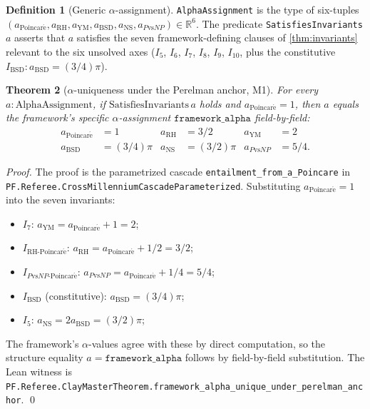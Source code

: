 \documentclass[11pt,a4paper]{article}
\theoremstyle{plain}
\newtheorem{theorem}{Theorem}[section]
\theoremstyle{definition}
\newtheorem{definition}[theorem]{Definition}
\begin{document}
\begin{definition}[Generic $\alpha$-assignment]
\label{def:alpha_assignment}
\texttt{AlphaAssignment} is the type of six-tuples
$(a_{\mathrm{Poincar\acute e}}, a_{\mathrm{RH}}, a_{\mathrm{YM}},
a_{\mathrm{BSD}}, a_{\mathrm{NS}}, a_{P \mathrm{vs} NP}) \in \mathbb{R}^{6}$.
The predicate \texttt{SatisfiesInvariants $a$} asserts that $a$
satisfies the seven framework-defining clauses of
\cref{thm:invariants} relevant to the six unsolved axes ($I_{5}$,
$I_{6}$, $I_{7}$, $I_{8}$, $I_{9}$, $I_{10}$, plus the constitutive
$I_{\mathrm{BSD}}: a_{\mathrm{BSD}} = (3/4)\pi$).
\end{definition}

\begin{theorem}[$\alpha$-uniqueness under the Perelman anchor, M1]
\label{thm:uniqueness}
For every $a : \mathrm{AlphaAssignment}$, if
$\mathrm{SatisfiesInvariants}\,a$ holds and
$a_{\mathrm{Poincar\acute e}} = 1$, then $a$ equals the framework's
specific $\alpha$-assignment $\mathtt{framework\_alpha}$
field-by-field:
\begin{align*}
a_{\mathrm{Poincar\acute e}} &= 1 &
a_{\mathrm{RH}} &= 3/2 &
a_{\mathrm{YM}} &= 2 \\
a_{\mathrm{BSD}} &= (3/4)\pi &
a_{\mathrm{NS}} &= (3/2)\pi &
a_{P\mathrm{vs}NP} &= 5/4.
\end{align*}
\end{theorem}

\begin{proof}
The proof is the parametrized cascade
\texttt{entailment\_from\_a\_Poincare} in
\texttt{PF.Referee.CrossMillenniumCascadeParameterized}. Substituting
$a_{\mathrm{Poincar\acute e}} = 1$ into the seven invariants:
\begin{itemize}[leftmargin=*,nosep]
\item $I_{7}$: $a_{\mathrm{YM}} = a_{\mathrm{Poincar\acute e}} + 1 = 2$;
\item $I_{\mathrm{RH}\text{-}\mathrm{Poincar\acute e}}$:
  $a_{\mathrm{RH}} = a_{\mathrm{Poincar\acute e}} + 1/2 = 3/2$;
\item $I_{P\mathrm{vs}NP\text{-}\mathrm{Poincar\acute e}}$:
  $a_{P\mathrm{vs}NP} = a_{\mathrm{Poincar\acute e}} + 1/4 = 5/4$;
\item $I_{\mathrm{BSD}}$ (constitutive): $a_{\mathrm{BSD}} = (3/4)\pi$;
\item $I_{5}$: $a_{\mathrm{NS}} = 2 a_{\mathrm{BSD}} = (3/2)\pi$;
\end{itemize}
The framework's $\alpha$-values agree with these by direct
computation, so the structure equality $a = \mathtt{framework\_alpha}$
follows by field-by-field substitution. The Lean witness is
\texttt{PF.Referee.ClayMasterTheorem.framework\_alpha\_unique\_under\_perelman\_anchor}.
\qed
\end{proof}
\end{document}
